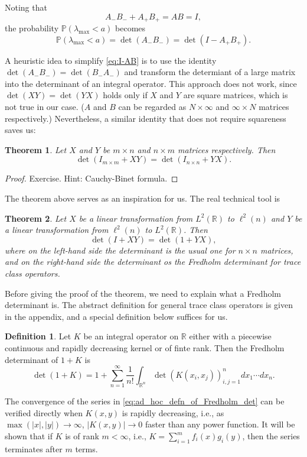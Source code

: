 \documentclass[11pt, a4paper]{article}
\numberwithin{equation}{section}
\newcommand{\realR}{\mathbb{R}}
\newcommand{\ie}{i.e.}
\newcommand{\Prob}{\mathbb{P}}
\newtheorem{thm}{Theorem}
\theoremstyle{definition}
\newtheorem{defn}{Definition}
\theoremstyle{remark}
\begin{document}
Noting that
\begin{equation}
  A_- B_- + A_+ B_+ = AB = I,
\end{equation}
the probability $\Prob(\lambda_{\max} < a)$ becomes
\begin{equation} \label{eq:I-AB}
  \Prob(\lambda_{\max} < a) = \det(A_- B_-) = \det(I - A_+ B_+).
\end{equation}

A heuristic idea to simplify \eqref{eq:I-AB} is to use the identity $\det(A_- B_-) = \det(B_- A_-)$ and transform the determiant of a large matrix into the determinant of an integral operator. This approach does not work, since $\det(XY) = \det(YX)$ holds only if $X$ and $Y$ are square matrices, which is not true in our case. ($A$ and $B$ can be regarded as $N \times \infty$ and $\infty \times N$ matrices respectively.) Nevertheless, a similar identity that does not require squareness saves us:
\begin{thm}
  Let $X$ and $Y$ be $m \times n$ and $n \times m$ matrices respectively. Then
  \begin{equation}
    \det(I_{m \times m} + XY) = \det(I_{n \times n} + YX).
  \end{equation}
\end{thm}
\begin{proof}
  Exercise. Hint: Cauchy-Binet formula.
\end{proof}

The theorem above serves as an inspiration for us. The real technical tool is
\begin{thm} \label{thm:change_to_Fred_det}
  Let $X$ be a linear transformation from $L^2(\realR)$ to $\ell^2(n)$ and $Y$ be a linear transformation from $\ell^2(n)$ to $L^2(\realR)$. Then
  \begin{equation}
    \det(I + XY) = \det(1 + YX),
  \end{equation}
  where on the left-hand side the determinant is the usual one for $n \times n$ matrices, and on the right-hand side the determinant os the \emph{Fredholm determinant} for trace class operators.
\end{thm}
Before giving the proof of the theorem, we need to explain what a Fredholm determinant is. The abstract definition for general trace class operators is given in the appendix, and a special definition below suffices for us.
\begin{defn}
  Let $K$ be an integral operator on $\realR$ either with a piecewise continuous and rapidly decreasing kernel or of finte rank. Then the Fredholm determinant of $1 + K$ is
  \begin{equation} \label{eq:ad_hoc_defn_of_Fredholm_det}
    \det(1 + K) = 1 + \sum^{\infty}_{n = 1} \frac{1}{n!} \int_{\realR^n} \det(K(x_i, x_j))^n_{i, j = 1} dx_1 \dotsm dx_n.
  \end{equation}
\end{defn}
The convergence of the series in \eqref{eq:ad_hoc_defn_of_Fredholm_det} can be verified directly when $K(x, y)$ is rapidly decreasing, \ie, as $\max(\lvert x \rvert, \lvert y \rvert) \to \infty$, $\lvert K(x, y) \rvert \to 0$ faster than any power function. It will be shown that if $K$ is of rank $m < \infty$, \ie, $K = \sum^m_{i = 1} f_i(x) g_i(y)$, then the series terminates after $m$ terms.
\end{document}

